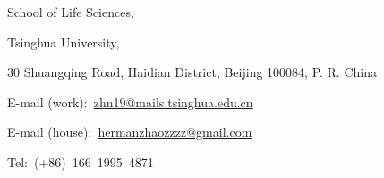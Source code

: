 School of Life Sciences, 

Tsinghua University,

30 Shuangqing Road, Haidian District, Beijing 100084, P. R. China

E-mail (work):~\href{mailto:zhn19@mails.tsinghua.edu.cn}{zhn19@mails.tsinghua.edu.cn}

E-mail (house):~\href{mailto:hermanzhaozzzz@gmail.com}{hermanzhaozzzz@gmail.com}

Tel:~(+86)~166~1995~4871